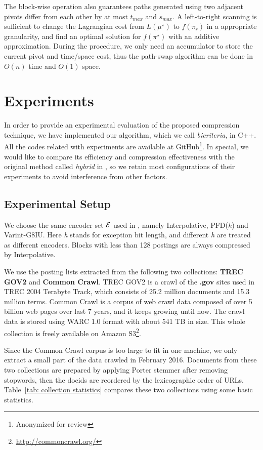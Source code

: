 \documentclass{sig-alternate-05-2015}
\begin{document}
The block-wise operation also guarantees paths generated using two adjacent pivots differ from each other by at most $ t_{max} $ and $ s_{max} $.
A left-to-right scanning is sufficient to change the Lagrangian cost from $ L(\mu^\star) $ to $ f(\pi_r) $ in a appropriate granularity, and find an optimal solution for $ f(\pi^\star) $ with an additive approximation.
During the procedure, we only need an accumulator to store the current pivot and time/space cost, thus the path-swap algorithm can be done in $ O(n) $ time and $ O(1) $ space.

\section{Experiments}\label{sec: experiments}
In order to provide an experimental evaluation of the proposed compression technique, we have implemented our algorithm, which we call \textit{bicriteria}, in C++.
All the codes related with experiments are available at GitHub\footnote{Anonymized for review}.
In special, we would like to compare its efficiency and compression effectiveness with the original method called \textit{hybrid} in \cite{ottaviano2015optimal}, so we retain most configurations of their experiments to avoid interference from other factors.

\subsection{Experimental Setup}
We choose the same encoder set $ \cal E $ used in \cite{ottaviano2015optimal}, namely Interpolative, PFD(\textit{h}) and Varint-G8IU.
Here \textit{h} stands for exception bit length, and different \textit{h} are treated as different encoders.
Blocks with less than 128 postings are always compressed by Interpolative.

We use the posting lists extracted from the following two collections: \textbf{TREC GOV2} and \textbf{Common Crawl}.
TREC GOV2 is a crawl of the \textbf{.gov} sites used in TREC 2004 Terabyte Track, which consists of 25.2 million documents and 15.3 million terms.
Common Crawl is a corpus of web crawl data composed of over 5 billion web pages over last 7 years, and it keeps growing until now.
The crawl data is stored using WARC 1.0 format with about 541 TB in size.
This whole collection is freely available on Amazon S3\footnote{\url{http://commoncrawl.org/}}. 


Since the Common Crawl corpus is too large to fit in one machine, we only extract a small part of the data crawled in February 2016.
Documents from these two collections are prepared by applying Porter stemmer after removing stopwords, then the docids are reordered by the lexicographic order of URLs.
Table~\ref{tab: collection statistics} compares these two collections using some basic statistics.
\end{document}
